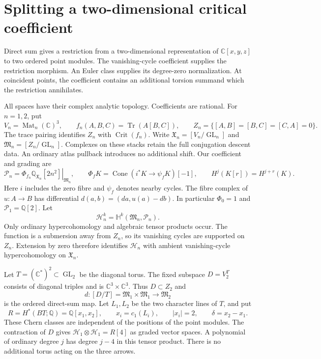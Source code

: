 \section{Splitting a two-dimensional critical coefficient}
\label{cr11:sec:restriction}

Direct sum gives a restriction from a two-dimensional representation
of $\mathbb C[x,y,z]$ to two ordered point modules.
The vanishing-cycle coefficient supplies the restriction morphism.
An Euler class supplies its degree-zero normalization.
At coincident points, the coefficient contains an additional torsion
summand which the restriction annihilates.

All spaces have their complex analytic topology. Coefficients are rational.
For $n=1,2$, put
\[
 V_n=\operatorname{Mat}_n(\mathbb C)^3,\qquad
 f_n(A,B,C)=\operatorname{Tr}(A[B,C]),\qquad
 Z_n=\{[A,B]=[B,C]=[C,A]=0\}.
\]
The trace pairing identifies $Z_n$ with $\operatorname{Crit}(f_n)$.
Write $\mathfrak X_n=[V_n/\operatorname{GL}_n]$ and
$\mathfrak M_n=[Z_n/\operatorname{GL}_n]$.
Complexes on these stacks retain the full conjugation descent data.
An ordinary atlas pullback introduces no additional shift.
Our coefficient and grading are
\[
 \mathcal P_n=\left.\Phi_{f_n}\mathbb Q_{\mathfrak X_n}[2n^2]
                    \right|_{\mathfrak M_n},\qquad
 \Phi_fK=\operatorname{Cone}(i^*K\longrightarrow\psi_fK)[-1],
 \qquad H^j(K[r])=H^{j+r}(K).
\]
Here $i$ includes the zero fibre and $\psi_f$ denotes nearby cycles.
The fibre complex of $u:A\to B$ has differential
$d(a,b)=(da,u(a)-db)$.
In particular $\Phi_0=1$ and $\mathcal P_1=\mathbb Q[2]$.
Let
\[
 \mathcal H_n^k=\mathbb H^k(\mathfrak M_n,\mathcal P_n).
\]
Only ordinary hypercohomology and algebraic tensor products occur.
The function is a submersion away from $Z_n$, so its vanishing cycles
are supported on $Z_n$.
Extension by zero therefore identifies $\mathcal H_n$ with ambient
vanishing-cycle hypercohomology on $\mathfrak X_n$.

Let $T=(\mathbb C^*)^2\subset\operatorname{GL}_2$ be the diagonal torus.
The fixed subspace $D=V_2^T$ consists of diagonal triples and is
$\mathbb C^3\times\mathbb C^3$.
Thus $D\subset Z_2$ and
\[
 d:[D/T]=\mathfrak M_1\times\mathfrak M_1\longrightarrow\mathfrak M_2
\]
is the ordered direct-sum map.
Let $L_1,L_2$ be the two character lines of $T$, and put
\[
 R=H^*(BT;\mathbb Q)=\mathbb Q[x_1,x_2],\qquad
 x_i=c_1(L_i),\qquad |x_i|=2,\qquad \delta=x_2-x_1.
\]
These Chern classes are independent of the positions of the point modules.
The contraction of $D$ gives
$\mathcal H_1\otimes\mathcal H_1=R[4]$ as graded vector spaces.
A polynomial of ordinary degree $j$ has degree $j-4$ in this tensor product.
There is no additional torus acting on the three arrows.

